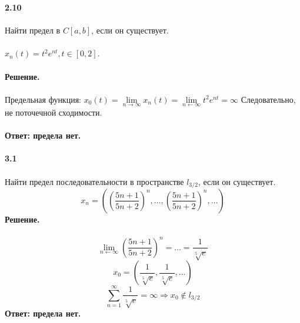 \documentclass[10pt,a4paper]{article}
\begin{document}
	\noindent\textbf{2.10} \\  \\
	Найти предел в $C[a, b]$, если он существует.\\ \\
	$x_n(t) = t^2e^{nt}, t \in [0, 2]$. \\ \\
	\textbf{Решение.} \\ \\
	Предельная функция:
	$x_0(t) = \lim\limits_{n \rightarrow \infty} x_n(t) = \lim\limits_{n \leftarrow \infty} t^2e^{nt} = \infty$
	Следовательно, не поточечной сходимости. \\ \\ 
	\textbf{Ответ: предела нет.} \\ \\
	
	
	\noindent\textbf{3.1} \\  \\
	Найти предел последовательности в пространстве $l_{3/2}$, если он существует. \\
	$$x_n = \left(\left(\frac{5n + 1}{5n + 2}\right)^n, \dots, \left(\frac{5n + 1}{5n + 2}\right)^n, \dots \right) $$
	\textbf{Решение.} \\ \\
	$$\lim\limits_{n \leftarrow \infty}\left(\frac{5n + 1}{5n + 2}\right)^n = \dots = \frac{1}{\sqrt[5]{e}}$$
	$$x_0 = \left(\frac{1}{\sqrt[5]{e}}, \frac{1}{\sqrt[5]{e}}, \dots \right) $$
	$$\sum_{n = 1}^{\infty} \frac{1}{\sqrt[5]{e}} = \infty \Rightarrow x_0 \notin l_{3/2}$$
	\textbf{Ответ: предела нет.} \\ \\
\end{document}
